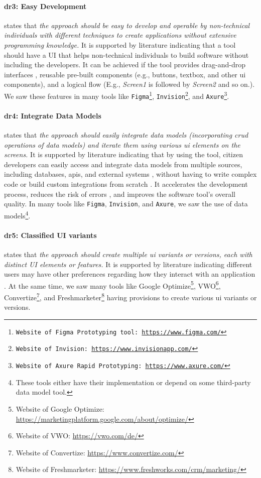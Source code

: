 \paragraph{\ac{dr}3: Easy Development} states that \textit{the approach should be easy to develop and operable by non-technical individuals with different techniques to create applications without extensive programming knowledge.}
It is supported by literature indicating that a tool should have a UI that helps non-technical individuals to build software without including the developers. 
It can be achieved if the tool provides drag-and-drop interfaces \cite{article:nocode:miller}, reusable pre-built components \cite{article:prototyping:lowcode} (e.g., buttons, textbox, and other \ac{ui} components), and a logical flow (E.g., \textit{Screen1} is followed by \textit{Screen2} and so on.). 
We saw these features in many tools like \texttt{Figma\footnote{Website of Figma Prototyping tool: \url{https://www.figma.com/}}}, \texttt{Invision\footnote{Website of Invision: \url{https://www.invisionapp.com/}}}, and \texttt{Axure\footnote{Website of Axure Rapid Prototyping: \url{https://www.axure.com/}}}.

\paragraph{\ac{dr}4: Integrate Data Models} states that \textit{the approach should easily integrate data models (incorporating \ac{crud} operations of data models) and iterate them using various \ac{ui} elements on the screens.} 
It is supported by literature indicating that by using the tool, citizen developers can easily access and integrate data models from multiple sources, including databases, \ac{api}s, and external systems \cite{paper:lowcode:khorram}, without having to write complex code or build custom integrations from scratch \cite{article:lowcode:modeldriven}.
It accelerates the development process, reduces the risk of errors \cite{misc:lowcode:platforms}, and improves the software tool's overall quality.
In many tools like \texttt{Figma}, \texttt{Invision}, and \texttt{Axure}, we saw the use of data models\footnote{These tools either have their implementation or depend on some third-party data model tool.}.

\paragraph{\ac{dr}5: Classified UI variants} states that \textit{the approach should create multiple \ac{ui} variants or versions, each with distinct UI elements or features.}
It is supported by literature indicating different users may have other preferences regarding how they interact with an application \cite{article:swdemand:ahmed}.
At the same time, we saw many tools like Google Optimize\footnote{Website of Google Optimize: \url{https://marketingplatform.google.com/about/optimize/}}, VWO\footnote{Website of VWO: \url{https://vwo.com/de/}}, Convertize\footnote{Website of Convertize: \url{https://www.convertize.com/}}, and Freshmarketer\footnote{Website of Freshmarketer: \url{https://www.freshworks.com/crm/marketing/}} having provisions to create various \ac{ui} variants or versions.


